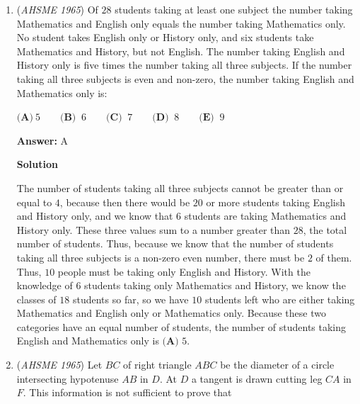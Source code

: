 \begin{enumerate}
 Thus, because $A$ was on the escalator for $\frac{3}{4}$ as long as $Z$ was, $A$ only gained $\frac{3}{4}$ as many "free" steps (i.e. steps that do not have to be taken because the escalator is moving down). We know that $A$ gained $(n-27)$ free steps, and $Z$ gained $(n-18)$ free steps. Thus we have the following equation: $n-27=\frac{3}{4}(n-18)$. Solving for $n$ gives us $\boxed{\textbf{(B) }54}$.

 


	\item (\textit{AHSME 1965}) Of $28$ students taking at least one subject the number taking Mathematics and English only equals the number 
taking Mathematics only. No student takes English only or History only, and six students take Mathematics and 
History, but not English. The number taking English and History only is five times the number taking all three subjects. 
If the number taking all three subjects is even and non-zero, the number taking English and Mathematics only is: 


 $\textbf{(A)}\ 5 \qquad  \textbf{(B) }\ 6 \qquad  \textbf{(C) }\ 7 \qquad  \textbf{(D) }\ 8 \qquad  \textbf{(E) }\ 9$

 \textbf{Answer: }A



\textbf{Solution}

The number of students taking all three subjects cannot be greater than or equal to $4$, because then there would be $20$ or more students taking English and History only, and we know that $6$ students are taking Mathematics and History only. These three values sum to a number greater than $28$, the total number of students. Thus, because we know that the number of students taking all three subjects is a non-zero even number, there must be $2$ of them. Thus, $10$ people must be taking only English and History. With the knowledge of $6$ students taking only Mathematics and History, we know the classes of $18$ students so far, so we have $10$ students left who are either taking Mathematics and English only or Mathematics only. Because these two categories have an equal number of students, the number of students taking English and Mathematics only is $\boxed{\textbf{(A) }5}$.

 


	\item (\textit{AHSME 1965}) Let $BC$ of right triangle $ABC$ be the diameter of a circle intersecting hypotenuse $AB$ in $D$. 
At $D$ a tangent is drawn cutting leg $CA$ in $F$. This information is not sufficient to prove that 



\end{enumerate}
